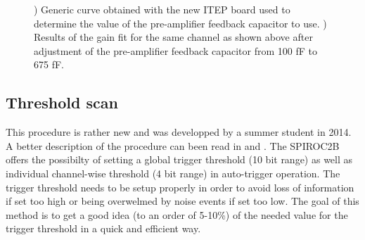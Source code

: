 \begin{figure}[htbp!]
\begin{subfigure}[t]{0.49\textwidth}
    \caption{} \label{fig:Gain675fF}
  \end{subfigure}
  \caption{) Generic curve obtained with the new ITEP board used to determine the value of the pre-amplifier feedback capacitor to use. ) Results of the gain fit for the same channel as shown above after adjustment of the pre-amplifier feedback capacitor from 100 fF to 675 fF.}
\end{figure}

\subsection{Threshold scan}

This procedure is rather new and was developped by a summer student in 2014. A better description of the procedure can been read in \cite{Hartbrich:2016bbz} and \cite{LloydTrigger}. The SPIROC2B offers the possibilty of setting a global trigger threshold (10 bit range) as well as individual channel-wise threshold (4 bit range) in auto-trigger operation. The trigger threshold needs to be setup properly in order to avoid loss of information if set too high or being overwelmed by noise events if set too low. The goal of this method is to get a good idea (to an order of 5-10\%) of the needed value for the trigger threshold in a quick and efficient way.

